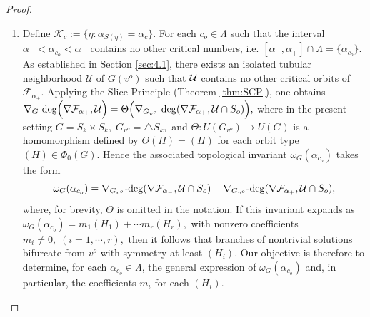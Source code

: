 \documentclass{amsart}%
\begin{document}
\begin{proof}
\begin{enumerate}
\item[i)] Define $\mathscr K_c:=\{\eta:\alpha_{S(\eta)}=\alpha_c\}.$ For each $c_o\in \Lambda$ such that the interval $\alpha_-<\alpha_{c_o}<\alpha_+$ contains no other critical numbers, i.e. $[\alpha_-, \alpha_+]\cap\Lambda=\{\alpha_{c_o}\}.$ As established in Section \ref{sec:4.1}, there exists an isolated tubular neighborhood $\mathcal U$ of $G(v^o)$ such that $\Bar {\mathcal U}$ contains no other critical orbits of $\mathcal F_{\alpha_{\pm}}$. Applying the Slice Principle (Theorem \ref{thm:SCP}), one obtains
$\nabla_{G}\text{\textrm{-deg}}\Big(\nabla\mathcal F_{\alpha_{\pm}}
,\mathcal U\Big)=\Theta\Big(\nabla_{G_{v^o}}\text{\textrm{-deg}}(\nabla \mathcal F_{\alpha_{\pm}}
,\mathcal U\cap S_o)\Big),$
where in the present setting $G=S_k\times S_k,\; G_{v^o}=\triangle S_k,$ and $\Theta: U(G_{v^o})\to U(G)$ is a homomorphism defined by $\Theta(H)=(H)$ for each orbit type $(H)\in \Phi_0(G).$ Hence the associated topological invariant $\omega_G(\alpha_{c_o})$ takes the form
\begin{equation}\label{eqn:invariant}
\omega_G(\alpha_{c_o})=\nabla_{G_{v^o}}\text{\textrm{-deg}}(\nabla\mathcal F_{\alpha_{-}}
,\mathcal U\cap S_o)-\nabla_{G_{v^o}}\text{\textrm{-deg}}(\nabla\mathcal F_{\alpha_{+}}
,\mathcal U\cap S_o),
\end{equation}
where, for brevity, $\Theta$ is omitted in the notation. \vskip0.3cm
\noindent If this invariant expands as
$\omega_G(\alpha_{c_o})=m_1(H_1)+\cdots m_r(H_r),$
with nonzero coefficients $m_i\neq 0, \; (i=1,\cdots, r),$ then it follows that branches of nontrivial solutions bifurcate from $v^o$ with symmetry at least $(H_i).$ Our objective is therefore to determine, for each $\alpha_{c_o}\in \Lambda$, the general expression of $\omega_G(\alpha_{c_o})$ and, in particular, the coefficients $m_i$ for each $(H_i).$ \vskip0.3cm


\end{enumerate}
\end{proof}
\end{document}
